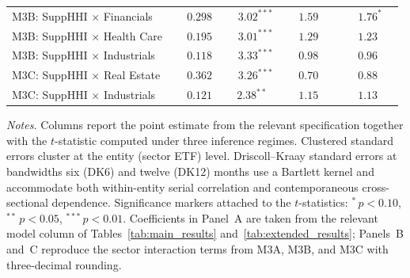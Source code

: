 \begin{table}[!htbp]
\begin{threeparttable}
\begin{tabular}{l c c c c}
M3B: SuppHHI $\times$ Financials      & $\phantom{-}0.298$  & $\phantom{-}3.02^{***}$ & $\phantom{-}1.59\phantom{^{***}}$ & $\phantom{-}1.76^{*\phantom{**}}$ \\
M3B: SuppHHI $\times$ Health Care     & $\phantom{-}0.195$  & $\phantom{-}3.01^{***}$ & $\phantom{-}1.29\phantom{^{***}}$ & $\phantom{-}1.23\phantom{^{***}}$ \\
M3B: SuppHHI $\times$ Industrials     & $\phantom{-}0.118$  & $\phantom{-}3.33^{***}$ & $\phantom{-}0.98\phantom{^{***}}$ & $\phantom{-}0.96\phantom{^{***}}$ \\
M3C: SuppHHI $\times$ Real Estate     & $\phantom{-}0.362$  & $\phantom{-}3.26^{***}$ & $\phantom{-}0.70\phantom{^{***}}$ & $\phantom{-}0.88\phantom{^{***}}$ \\
M3C: SuppHHI $\times$ Industrials     & $\phantom{-}0.121$  & $\phantom{-}2.38^{**\phantom{*}}$ & $\phantom{-}1.15\phantom{^{***}}$ & $\phantom{-}1.13\phantom{^{***}}$ \\
\bottomrule
\end{tabular}

\begin{tablenotes}[flushleft]
\footnotesize
\item \textit{Notes.} Columns report the point estimate from the relevant
specification together with the $t$-statistic computed under three
inference regimes. Clustered standard errors cluster at the entity (sector
ETF) level. Driscoll--Kraay standard errors at bandwidths six (DK6) and
twelve (DK12) months use a Bartlett kernel and accommodate both within-entity
serial correlation and contemporaneous cross-sectional dependence.
Significance markers attached to the $t$-statistics:
$^{*}\,p<0.10$, $^{**}\,p<0.05$, $^{***}\,p<0.01$. Coefficients in
Panel~A are taken from the relevant model column of Tables~\ref{tab:main_results}
and~\ref{tab:extended_results}; Panels~B and~C reproduce the sector
interaction terms from M3A, M3B, and M3C with three-decimal rounding.
\end{tablenotes}
\end{threeparttable}

\end{table}
